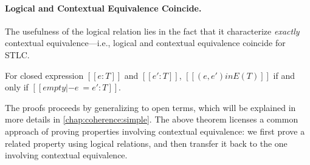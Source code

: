\paragraph{Logical and Contextual Equivalence Coincide.}

The usefulness of the logical relation lies in the fact that it characterize
\textit{exactly} contextual equivalence---i.e., logical and contextual equivalence
coincide for STLC.

\begin{theorem}
  For closed expression $[[e : T]]$ and $[[e' : T]]$, $[[ (e, e') in E(T)  ]]$ if and only if $[[  empty |- e ~= e' : T  ]]$.
\end{theorem}

The proofs proceeds by generalizing to open terms, which will be explained in
more details in \cref{chap:coherence:simple}. The above theorem licenses a
common approach of proving properties involving contextual equivalence: we first
prove a related property using logical relations, and then transfer it back to
the one involving contextual equivalence.




